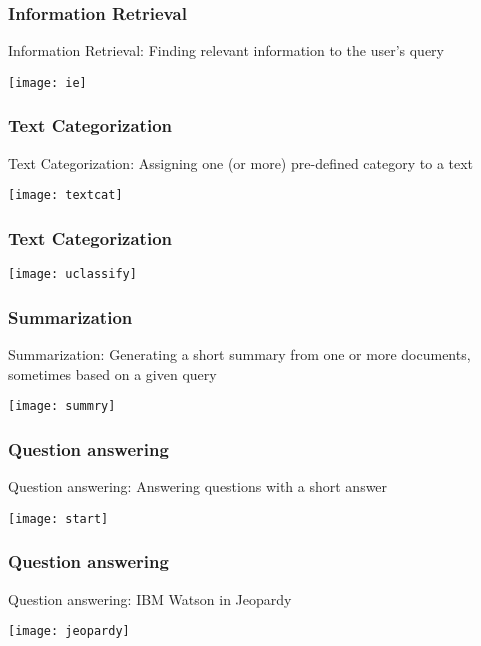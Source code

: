 \begin{frame}[fragile]\frametitle{Information Retrieval}
Information Retrieval: Finding relevant information to the user's query
\begin{center}
\texttt{[image: ie]}
\end{center}

\end{frame}

\begin{frame}[fragile]\frametitle{Text Categorization}
Text Categorization: Assigning one (or more) pre-defined category to a text
\begin{center}
\texttt{[image: textcat]}
\end{center}
\end{frame}

\begin{frame}[fragile]\frametitle{Text Categorization}
\begin{center}
\texttt{[image: uclassify]}
\end{center}
\end{frame}


\begin{frame}[fragile]\frametitle{Summarization}
Summarization: Generating a short summary from one or more documents, sometimes based on a given query
\begin{center}
\texttt{[image: summry]}
\end{center}
\end{frame}

\begin{frame}[fragile]\frametitle{Question answering}
Question answering: Answering questions with a short answer
\begin{center}
\texttt{[image: start]}
\end{center}
\end{frame}

\begin{frame}[fragile]\frametitle{Question answering}
Question answering: IBM Watson in Jeopardy
\begin{center}
\texttt{[image: jeopardy]}
\end{center}
\end{frame}

